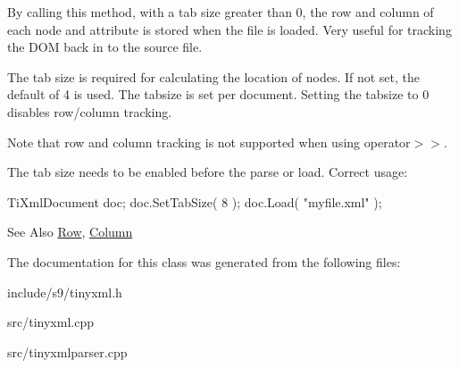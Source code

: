 By calling this method, with a tab size greater than 0, the row and column of each node and attribute is stored when the file is loaded. Very useful for tracking the D\-O\-M back in to the source file.

The tab size is required for calculating the location of nodes. If not set, the default of 4 is used. The tabsize is set per document. Setting the tabsize to 0 disables row/column tracking.

Note that row and column tracking is not supported when using operator$>$$>$.

The tab size needs to be enabled before the parse or load. Correct usage\-: \begin{DoxyVerb}TiXmlDocument doc;
doc.SetTabSize( 8 );
doc.Load( "myfile.xml" );
\end{DoxyVerb}


\begin{DoxySeeAlso}{See Also}
\hyperlink{classTiXmlBase_a024bceb070188df92c2a8d8852dd0853}{Row}, \hyperlink{classTiXmlBase_ab54bfb9b70fe6dd276e7b279cab7f003}{Column} 
\end{DoxySeeAlso}


The documentation for this class was generated from the following files\-:\begin{DoxyCompactItemize}
\item 
include/s9/tinyxml.\-h\item 
src/tinyxml.\-cpp\item 
src/tinyxmlparser.\-cpp\end{DoxyCompactItemize}
